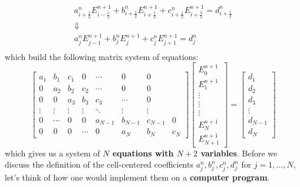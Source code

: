 \documentclass[11pt]{article}
\begin{document}
\begin{enumerate}
    \begin{equation}
      \begin{gathered}
        a_{i+\frac{1}{2}}^n E_{i-\frac{1}{2}}^{n+1} + b_{i+\frac{1}{2}}^n E_{i+\frac{1}{2}}^{n+1} + c_{i+\frac{1}{2}}^n E_{i+\frac{3}{2}}^{n+1} = d_{i+\frac{1}{2}}^n \\
        \Downarrow\\
        a_{j}^n E_{j-1}^{n+1} + b_{j}^n E_{j}^{n+1} + c_{j}^n E_{j+1}^{n+1} = d_{j}^n \\
      \end{gathered}
    \end{equation}
    which build the following matrix system of equations:
    \begin{equation}
    \begin{bmatrix}
    a_1 & b_1 & c_1 & 0 & \cdots & 0 & 0\\
    0 & a_2 & b_2 & c_2 & \cdots & 0 & 0 \\  
    0 & 0 & a_3 & b_3 & c_3 &\cdots & 0 \\
    \vdots & \vdots & \vdots & \vdots & \ddots & \vdots & \vdots \\
    0  & \cdots & 0 & 0 & a_{N-1} & b_{N-1} & c_{N-1} & 0 \\
    0 & 0 & 0 & \cdots & 0 & a_{N} & b_{N} & c_{N}
    \end{bmatrix}
    \begin{bmatrix}
    E_0^{n+1} \\
    E_1^{n+1} \\
    \vdots \\
    \vdots \\
    \vdots \\
    E_{N}^{n+1} \\
    E_{N+1}^{n+1}
    \end{bmatrix}
    =
    \begin{bmatrix}
    d_1 \\
    d_2 \\
    d_3 \\
    \vdots \\
    d_{N-1} \\
    d_{N}
    \end{bmatrix}
    \end{equation}
    which gives us a system of \textbf{$N$ equations with $N+2$ variables}. \newline \newline
    Before we discuss the definition of the cell-centered coefficients $a_j^n, b_j^n, c_j^n, d_j^n$ for $j=1,...,N$, let's think of how one would implement them on a \textbf{computer program}.

\end{enumerate}
\end{document}
